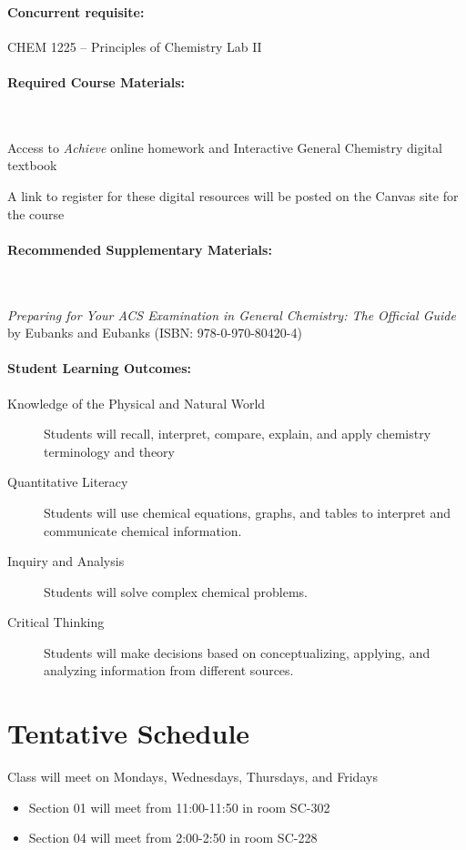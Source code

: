 \documentclass[12pt, letterpaper]{article}
\begin{document}
\paragraph{Concurrent requisite:}
CHEM 1225 -- Principles of Chemistry Lab II

\paragraph{Required Course Materials:} ~

Access to \emph{Achieve} online homework and Interactive General Chemistry digital textbook

\noindent A link to register for these digital resources will be posted on the Canvas site for the course

\paragraph{Recommended Supplementary Materials:} ~

\emph{Preparing for Your ACS Examination in General Chemistry: The Official Guide} by Eubanks and Eubanks (ISBN: 978-0-970-80420-4)

\paragraph{Student Learning Outcomes:}
\begin{description}
	\item[Knowledge of the Physical and Natural World] Students will recall, interpret, compare, explain, and apply chemistry terminology and theory
	\item[Quantitative Literacy] Students will use chemical equations, graphs, and tables to interpret and communicate chemical information.
	\item[Inquiry and Analysis] Students will solve complex chemical problems.
	\item[Critical Thinking] Students will make decisions based on conceptualizing, applying, and analyzing information from different sources.
\end{description}

\section*{Tentative Schedule}
Class will meet on Mondays, Wednesdays, Thursdays, and Fridays
\begin{itemize}
  \item Section 01 will meet from 11:00-11:50 in room SC-302
  \item Section 04 will meet from 2:00-2:50 in room SC-228
\end{itemize}
\end{document}
